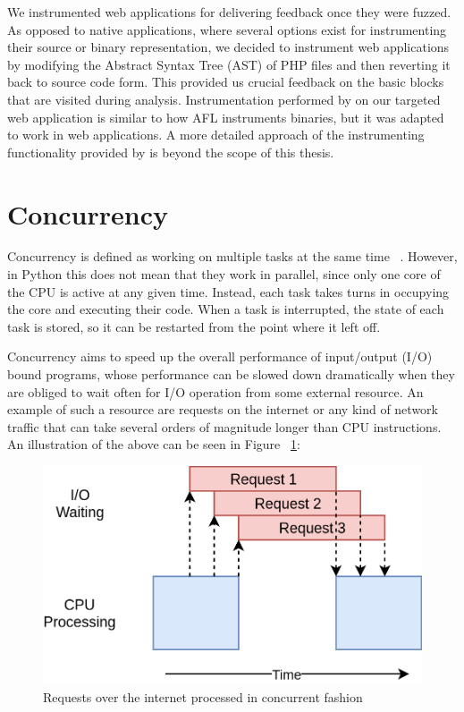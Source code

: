 We instrumented web applications for delivering feedback once they were fuzzed. As opposed to native applications, where several options exist for instrumenting their source or binary
representation, we decided to instrument web applications by modifying the Abstract Syntax Tree (AST) of PHP files and then reverting it back to source code form. This provided us crucial feedback on the basic blocks that are visited during analysis. Instrumentation performed by \pname on our targeted web application is similar to how AFL instruments binaries, but it was adapted to work in web applications. A more detailed approach of the instrumenting functionality provided by \pname is beyond the scope of this thesis.

\section{Concurrency}
Concurrency is defined as working on multiple tasks at the same time ~\cite{concurrency_realpython}. However, in Python this does not mean that they work in parallel, since only one core of the CPU is active at any given time. Instead, each task takes turns in occupying the core and executing their code. When a task is interrupted, the state of each task is stored, so it can be restarted from the point where it left off. 

Concurrency aims to speed up the overall performance of input/output (I/O) bound programs, whose performance can be slowed down dramatically when they are obliged to wait often for I/O operation from some external resource. An example of such a resource are requests on the internet or any kind of network traffic that can take several orders of magnitude longer than CPU instructions. An illustration of the above can be seen in Figure ~\ref{fig:concurrency_example}:

\begin{figure}[ht]
 \centering
 \includegraphics[width=\linewidth]{figures/concurrency_example.png}
 \caption{Requests over the internet processed in concurrent fashion ~\cite{concurrency_realpython}}
 \label{fig:concurrency_example}
\end{figure}

